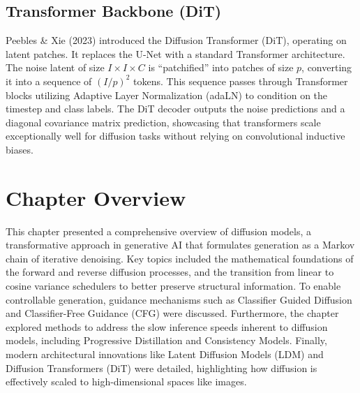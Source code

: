 \subsection{Transformer Backbone (DiT)}
Peebles \& Xie (2023) introduced the Diffusion Transformer (DiT), operating on latent patches. It replaces the U-Net with a standard Transformer architecture. The noise latent of size $I \times I \times C$ is ``patchified'' into patches of size $p$, converting it into a sequence of $(I/p)^2$ tokens. This sequence passes through Transformer blocks utilizing Adaptive Layer Normalization (adaLN) to condition on the timestep and class labels. The DiT decoder outputs the noise predictions and a diagonal covariance matrix prediction, showcasing that transformers scale exceptionally well for diffusion tasks without relying on convolutional inductive biases.

\section{Chapter Overview}

This chapter presented a comprehensive overview of diffusion models, a transformative approach in generative AI that formulates generation as a Markov chain of iterative denoising. Key topics included the mathematical foundations of the forward and reverse diffusion processes, and the transition from linear to cosine variance schedulers to better preserve structural information. To enable controllable generation, guidance mechanisms such as Classifier Guided Diffusion and Classifier-Free Guidance (CFG) were discussed. Furthermore, the chapter explored methods to address the slow inference speeds inherent to diffusion models, including Progressive Distillation and Consistency Models. Finally, modern architectural innovations like Latent Diffusion Models (LDM) and Diffusion Transformers (DiT) were detailed, highlighting how diffusion is effectively scaled to high-dimensional spaces like images.

